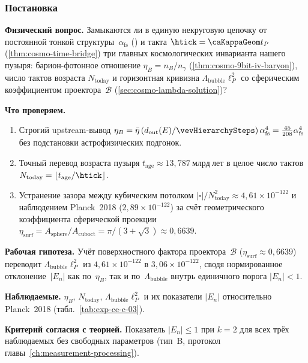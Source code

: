 \label{exp:cec03}

\subsubsection*{Постановка}
\textbf{Физический вопрос.}
Замыкаются ли в единую некруговую цепочку от постоянной тонкой структуры~$\alpha_{\mathrm{fs}}$ () и такта $\htick = \caKappaGeom t_P$ (\cref{thm:cosmo-time-bridge}) три главных космологических инварианта нашего пузыря: барион-фотонное отношение $\eta_B = n_B/n_\gamma$ (\cref{thm:cosmo-9bit-iv-baryon}), число тактов возраста $N_{\mathrm{today}}$ и горизонтная кривизна $\Lambda_{\mathrm{bubble}}\ell_P^2$ со сферическим коэффициентом проектора~$\mathcal{B}$ (\cref{sec:cosmo-lambda-solution})?

\textbf{Что проверяем.}
\begin{enumerate}[label=\textbf{(\alph*)},leftmargin=*,itemsep=0.25em]
\item Строгий upstream-вывод $\eta_B = \bar\eta\,(d_{\mathrm{out}}(E)/\vevHierarchySteps)\,\alpha_{\mathrm{fs}}^4 = \frac{45}{208}\alpha_{\mathrm{fs}}^4$ без подстановки астрофизических подгонок.
\item Точный перевод возраста пузыря $t_{\mathrm{age}} \approx 13{,}787\ \mathrm{млрд\ лет}$ в целое число тактов $N_{\mathrm{today}} = \lfloor t_{\mathrm{age}}/\htick\rfloor$.
\item Устранение зазора между кубическим потолком $|\square|/N_{\mathrm{today}}^2 \approx 4{,}61\times 10^{-122}$ и наблюдением Planck~2018 ($2{,}89\times 10^{-122}$) за счёт геометрического коэффициента сферической проекции $\eta_{\mathrm{surf}} = A_{\mathrm{sphere}}/A_{\mathrm{cuboct}} = \pi/(3+\sqrt{3}) \approx 0{,}6639$.
\end{enumerate}

\textbf{Рабочая гипотеза.}
Учёт поверхностного фактора проектора~$\mathcal{B}$ ($\eta_{\mathrm{surf}} \approx 0{,}6639$) переводит $\Lambda_{\mathrm{bubble}}\ell_P^2$ из $4{,}61\times 10^{-122}$ в $3{,}06\times 10^{-122}$, сводя нормированное отклонение~$|E_n|$ как по~$\eta_B$, так и по~$\Lambda_{\mathrm{bubble}}$ внутрь единичного порога $|E_n| < 1$.

\textbf{Наблюдаемые.}
$\eta_B$, $N_{\mathrm{today}}$, $\Lambda_{\mathrm{bubble}}\ell_P^2$ и их показатели $|E_n|$ относительно Planck~2018 (табл.~\ref{tab:exp-ce-c-03}).

\textbf{Критерий согласия с теорией.}
Показатель $|E_n| \le 1$ при $k=2$ для всех трёх наблюдаемых без свободных параметров (тип~B, протокол главы~\ref{ch:measurement-processing}).

